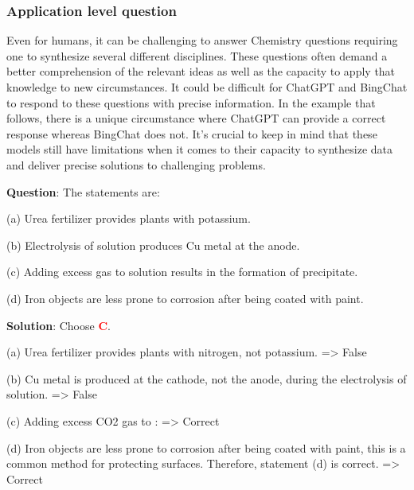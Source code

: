 \documentclass{article}
\begin{document}
{\begin{mdframed}[linewidth=1pt,linecolor=red]
	\end{mdframed}	
	
	\subsubsection{Application level question}
	
	\label{VNHSGE_Che_A}
	
	Even for humans, it can be challenging to answer Chemistry questions requiring one to synthesize several different disciplines. These questions often demand a better comprehension of the relevant ideas as well as the capacity to apply that knowledge to new circumstances. It could be difficult for ChatGPT and BingChat to respond to these questions with precise information. In the example that follows, there is a unique circumstance where ChatGPT can provide a correct response whereas BingChat does not. It's crucial to keep in mind that these models still have limitations when it comes to their capacity to synthesize data and deliver precise solutions to challenging problems.
	
	
	\begin{mdframed}[linewidth=1pt,linecolor=red] \textbf{Question}: The statements are:
		
		(a) Urea fertilizer provides plants with potassium.
		
		(b) Electrolysis of  solution produces Cu metal at the anode.
		
		(c) Adding excess  gas to  solution results in the formation of precipitate.
		
		(d) Iron objects are less prone to corrosion after being coated with paint.
		
		\begin{oneparchoices}
		\end{oneparchoices}
		
		\textbf{Solution}: Choose \textcolor{red}{\textbf{C}}.
		
		(a) Urea fertilizer provides plants with nitrogen, not potassium. => False
		
		(b) Cu metal is produced at the cathode, not the anode, during the electrolysis of  solution. => False
		
		(c) Adding excess CO2 gas to :  => Correct
		
		(d) Iron objects are less prone to corrosion after being coated with paint, this is a common method for protecting surfaces. Therefore, statement (d) is correct. => Correct
		

\end{mdframed}}
\end{document}
